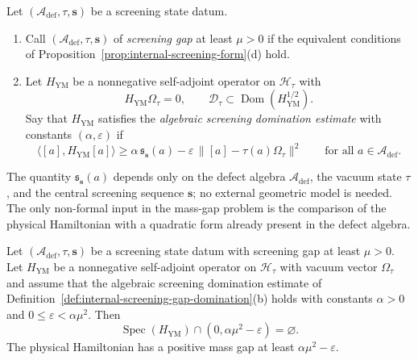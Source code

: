 \begin{definition}
\label{def:internal-screening-gap-domination}
Let $(\mathcal A_{\mathrm{def}},\tau,\mathbf s)$ be a screening state datum.
\begin{enumerate}[label=(\alph*)]
\item Call $(\mathcal A_{\mathrm{def}},\tau,\mathbf s)$ of \emph{screening gap} at least $\mu>0$
if the equivalent conditions of Proposition~\ref{prop:internal-screening-form}(d) hold.
\item Let $H_{\mathrm{YM}}$ be a nonnegative self-adjoint operator on $\mathcal H_\tau$ with
\[
H_{\mathrm{YM}}\Omega_\tau=0,
\qquad
\mathcal D_\tau\subset \operatorname{Dom}(H_{\mathrm{YM}}^{1/2}).
\]
Say that $H_{\mathrm{YM}}$ satisfies the \emph{algebraic screening domination estimate}
with constants $(\alpha,\varepsilon)$ if
\[
\bigl\langle [a],H_{\mathrm{YM}}[a]\bigr\rangle
\ge
\alpha\,\mathfrak s_{\mathbf s}(a)
-\varepsilon\,\bigl\|[a]-\tau(a)\Omega_\tau\bigr\|^2
\qquad\text{for all }a\in \mathcal A_{\mathrm{def}}.
\]
\end{enumerate}
\end{definition}

\begin{remark}
\label{rem:why-screening-estimate-is-internal}
The quantity $\mathfrak s_{\mathbf s}(a)$ depends only on the defect algebra $\mathcal A_{\mathrm{def}}$, the vacuum state $\tau$,
and the central screening sequence $\mathbf s$; no external geometric model is needed.
The only non-formal input in the mass-gap problem is the comparison of the physical
Hamiltonian with a quadratic form already present in the defect algebra.
\end{remark}

\begin{theorem}
\label{thm:mass-gap-reduction-internal-screening}
Let $(\mathcal A_{\mathrm{def}},\tau,\mathbf s)$ be a screening state datum with screening gap at least $\mu>0$.
Let $H_{\mathrm{YM}}$ be a nonnegative self-adjoint operator on $\mathcal H_\tau$ with vacuum vector
$\Omega_\tau$ and assume that the algebraic screening domination estimate of
Definition~\ref{def:internal-screening-gap-domination}(b) holds with constants $\alpha>0$ and
$0\le \varepsilon<\alpha\mu^2$.
Then
\[
\operatorname{Spec}(H_{\mathrm{YM}})\cap (0,\alpha\mu^2-\varepsilon)=\varnothing.
\]
The physical Hamiltonian has a positive mass gap at least $\alpha\mu^2-\varepsilon$.
\end{theorem}

